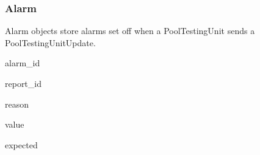 \subsubsection{Alarm}
\par
Alarm objects store alarms set off when a PoolTestingUnit sends a PoolTestingUnitUpdate.

{
	\item alarm\_id
	\item report\_id
	\item reason
	\item value
	\item expected
}
{
	\item
}